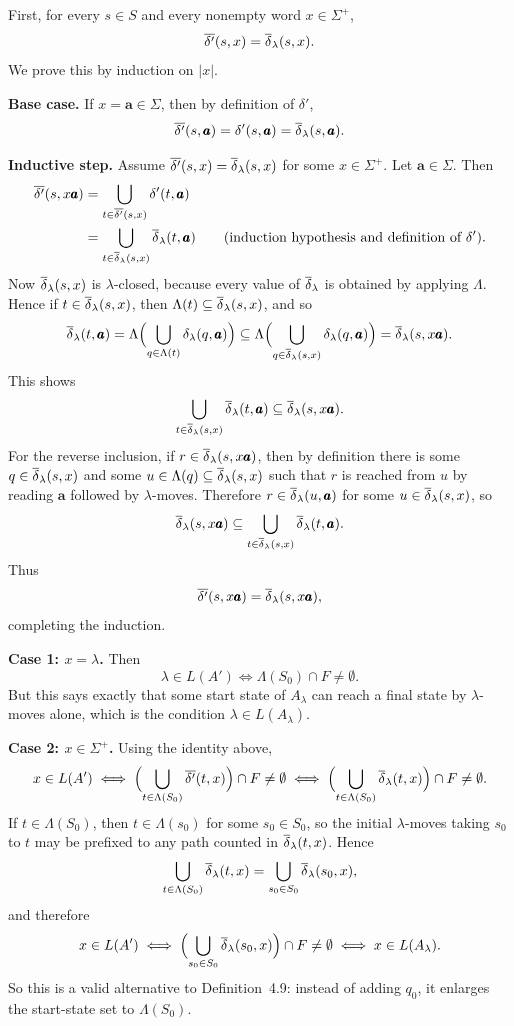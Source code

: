 \begin{enumerate}[{4.}1.]
First, for every $s\in S$ and every nonempty word $x\in\Sigma^+$,
\[
\overline{\delta'}(s,x)=\overline{\delta}_{\lambda}(s,x).
\]
We prove this by induction on $|x|$.

\textbf{Base case.}  If $x=\pmb{a}\in\Sigma$, then by definition of $\delta'$,
\[
\overline{\delta'}(s,\pmb{a})=\delta'(s,\pmb{a})=\overline{\delta}_{\lambda}(s,\pmb{a}).
\]

\textbf{Inductive step.}  Assume $\overline{\delta'}(s,x)=\overline{\delta}_{\lambda}(s,x)$
for some $x\in\Sigma^+$.  Let $\pmb{a}\in\Sigma$.  Then
\begin{align*}
\overline{\delta'}(s,x\pmb{a})
&=\bigcup_{t\in\overline{\delta'}(s,x)}\delta'(t,\pmb{a}) \\
&=\bigcup_{t\in\overline{\delta}_{\lambda}(s,x)}\overline{\delta}_{\lambda}(t,\pmb{a})
\qquad\text{(induction hypothesis and definition of $\delta'$).}
\end{align*}
Now $\overline{\delta}_{\lambda}(s,x)$ is $\lambda$-closed, because every value of
$\overline{\delta}_{\lambda}$ is obtained by applying $\Lambda$.  Hence if
$t\in\overline{\delta}_{\lambda}(s,x)$, then $\Lambda(t)\subseteq\overline{\delta}_{\lambda}(s,x)$, and
so
\[
\overline{\delta}_{\lambda}(t,\pmb{a})
=\Lambda\Bigl(\bigcup_{q\in\Lambda(t)}\delta_{\lambda}(q,\pmb{a})\Bigr)
\subseteq
\Lambda\Bigl(\bigcup_{q\in\overline{\delta}_{\lambda}(s,x)}\delta_{\lambda}(q,\pmb{a})\Bigr)
=\overline{\delta}_{\lambda}(s,x\pmb{a}).
\]
This shows
\[
\bigcup_{t\in\overline{\delta}_{\lambda}(s,x)}\overline{\delta}_{\lambda}(t,\pmb{a})
\subseteq \overline{\delta}_{\lambda}(s,x\pmb{a}).
\]
For the reverse inclusion, if $r\in\overline{\delta}_{\lambda}(s,x\pmb{a})$, then by
definition there is some $q\in\overline{\delta}_{\lambda}(s,x)$ and some
$u\in\Lambda(q)\subseteq\overline{\delta}_{\lambda}(s,x)$ such that $r$ is reached from $u$
by reading $\pmb{a}$ followed by $\lambda$-moves.  Therefore
$r\in\overline{\delta}_{\lambda}(u,\pmb{a})$ for some $u\in\overline{\delta}_{\lambda}(s,x)$, so
\[
\overline{\delta}_{\lambda}(s,x\pmb{a})
\subseteq
\bigcup_{t\in\overline{\delta}_{\lambda}(s,x)}\overline{\delta}_{\lambda}(t,\pmb{a}).
\]
Thus
\[
\overline{\delta'}(s,x\pmb{a})=\overline{\delta}_{\lambda}(s,x\pmb{a}),
\]
completing the induction.

\textbf{Case 1: $x=\lambda$.}  Then
\[
\lambda\in L(A')\iff \Lambda(S_0)\cap F\neq\emptyset.
\]
But this says exactly that some start state of $A_{\lambda}$ can reach a final
state by $\lambda$-moves alone, which is the condition $\lambda\in L(A_{\lambda})$.

\textbf{Case 2: $x\in\Sigma^+$.}  Using the identity above,
\[
x\in L(A')\iff
\Bigl(\bigcup_{t\in\Lambda(S_0)}\overline{\delta'}(t,x)\Bigr)\cap F\neq\emptyset
\iff
\Bigl(\bigcup_{t\in\Lambda(S_0)}\overline{\delta}_{\lambda}(t,x)\Bigr)\cap F\neq\emptyset.
\]
If $t\in\Lambda(S_0)$, then $t\in\Lambda(s_0)$ for some $s_0\in S_0$, so the
initial $\lambda$-moves taking $s_0$ to $t$ may be prefixed to any path counted
in $\overline{\delta}_{\lambda}(t,x)$. Hence
\[
\bigcup_{t\in\Lambda(S_0)}\overline{\delta}_{\lambda}(t,x)
=
\bigcup_{s_0\in S_0}\overline{\delta}_{\lambda}(s_0,x),
\]
and therefore
\[
x\in L(A')\iff
\Bigl(\bigcup_{s_0\in S_0}\overline{\delta}_{\lambda}(s_0,x)\Bigr)\cap F\neq\emptyset
\iff x\in L(A_{\lambda}).
\]
So this is a valid alternative to Definition~4.9: instead of adding $q_0$, it
enlarges the start-state set to $\Lambda(S_0)$.


\end{enumerate}
